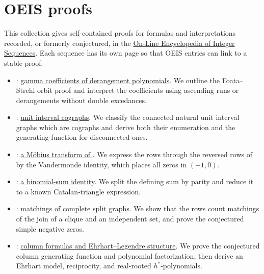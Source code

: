 

\section[oeisProofs]{OEIS proofs}

This collection gives self-contained proofs for formulas and interpretations
recorded, or formerly conjectured, in the
\href{https://oeis.org/}{On-Line Encyclopedia of Integer Sequences}.
Each sequence has its own page so that OEIS entries can link to a stable proof.

\begin{itemize}
\item {}:
\hyperref[oeisProofA046739]{gamma coefficients of derangement polynomials}.
We outline the Foata--Strehl orbit proof and interpret the coefficients
using ascending runs or derangements without double excedances.

\item {}:
\hyperref[oeisProofA152947]{unit interval cographs}.
We classify the connected natural unit interval graphs which are cographs and
derive both their enumeration and the generating function for disconnected
ones.

\item {}:
\hyperref[oeisProofA178301]{a Möbius transform of }.
We express the rows through the reversed rows of  by the Vandermonde identity,
which places all zeros in $(-1,0)$.

\item {}:
\hyperref[oeisProofA189912]{a binomial-sum identity}.
We split the defining sum by parity and reduce it to a known Catalan-triangle
expression.

\item {}:
\hyperref[oeisProofA321966]{matchings of complete split graphs}.
We show that the rows count matchings of the join of a clique and an
independent set, and prove the conjectured simple negative zeros.

\item {}:
\hyperref[oeisProofA358628]{column formulas and Ehrhart--Legendre structure}.
We prove the conjectured column generating function and polynomial
factorization, then derive an Ehrhart model, reciprocity, and real-rooted
$h^*$-polynomials.
\end{itemize}

